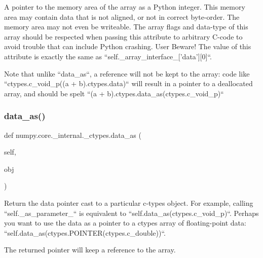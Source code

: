 \begin{DoxyVerb}A pointer to the memory area of the array as a Python integer.
This memory area may contain data that is not aligned, or not in correct
byte-order. The memory area may not even be writeable. The array
flags and data-type of this array should be respected when passing this
attribute to arbitrary C-code to avoid trouble that can include Python
crashing. User Beware! The value of this attribute is exactly the same
as ``self._array_interface_['data'][0]``.

Note that unlike ``data_as``, a reference will not be kept to the array:
code like ``ctypes.c_void_p((a + b).ctypes.data)`` will result in a
pointer to a deallocated array, and should be spelt
``(a + b).ctypes.data_as(ctypes.c_void_p)``
\end{DoxyVerb}
 \mbox{\label{classnumpy_1_1core_1_1__internal_1_1__ctypes_a0fe1e07d0e15c91c5eb499dbfb1faf3e}} 
\subsubsection{\texorpdfstring{data\+\_\+as()}{data\_as()}}
{\footnotesize\ttfamily def numpy.\+core.\+\_\+internal.\+\_\+ctypes.\+data\+\_\+as (\begin{DoxyParamCaption}\item[{}]{self,  }\item[{}]{obj }\end{DoxyParamCaption})}

\begin{DoxyVerb}Return the data pointer cast to a particular c-types object.
For example, calling ``self._as_parameter_`` is equivalent to
``self.data_as(ctypes.c_void_p)``. Perhaps you want to use the data as a
pointer to a ctypes array of floating-point data:
``self.data_as(ctypes.POINTER(ctypes.c_double))``.

The returned pointer will keep a reference to the array.
\end{DoxyVerb}
 \mbox{\label{classnumpy_1_1core_1_1__internal_1_1__ctypes_a6be9acd30b8fe40f0837207dc86b9334}} 

